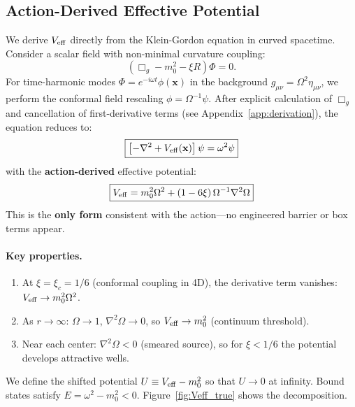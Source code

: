 \documentclass[aps,prd,onecolumn,notitlepage,nofootinbib,superscriptaddress,11pt,floatfix]{revtex4-2}
\begin{document}
\subsection{Action-Derived Effective Potential}
\label{sec:curvature}

We derive $V_{\rm eff}$ directly from the Klein-Gordon equation in curved spacetime. Consider a scalar field with non-minimal curvature coupling:
\begin{equation}
(\Box_g - m_0^2 - \xi R)\Phi = 0.
\label{eq:KG}
\end{equation}
For time-harmonic modes $\Phi = e^{-i\omega t}\phi(\mathbf{x})$ in the background $g_{\mu\nu} = \Omega^2 \eta_{\mu\nu}$, we perform the conformal field rescaling $\phi = \Omega^{-1}\psi$. After explicit calculation of $\Box_g$ and cancellation of first-derivative terms (see Appendix~\ref{app:derivation}), the equation reduces to:
\begin{equation}
\boxed{
\left[-\nabla^2 + V_{\rm eff}(\mathbf{x})\right]\psi = \omega^2 \psi
}
\label{eq:Schrodinger}
\end{equation}
with the \textbf{action-derived} effective potential:
\begin{equation}
\boxed{
V_{\rm eff} = m_0^2 \Omega^2 + (1 - 6\xi)\,\Omega^{-1} \nabla^2\Omega
}
\label{eq:Veff_true}
\end{equation}
This is the \textbf{only form} consistent with the action---no engineered barrier or box terms appear.

\paragraph{Key properties.}
\begin{enumerate}
    \item At $\xi = \xi_c = 1/6$ (conformal coupling in 4D), the derivative term vanishes: $V_{\rm eff} \to m_0^2\Omega^2$.
    \item As $r \to \infty$: $\Omega \to 1$, $\nabla^2\Omega \to 0$, so $V_{\rm eff} \to m_0^2$ (continuum threshold).
    \item Near each center: $\nabla^2\Omega < 0$ (smeared source), so for $\xi < 1/6$ the potential develops attractive wells.
\end{enumerate}

We define the shifted potential $U \equiv V_{\rm eff} - m_0^2$ so that $U \to 0$ at infinity. Bound states satisfy $E = \omega^2 - m_0^2 < 0$. Figure~\ref{fig:Veff_true} shows the decomposition.
\end{document}
